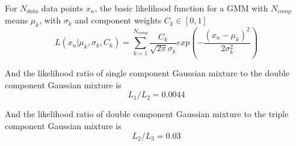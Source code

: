 \documentclass[journal,12pt,twocolumn]{IEEEtran}
\begin{document}
For $N_{data}$ data points $x_n$, the basic likelihood function for a GMM with $N_{comp}$ means $\mu_k$, with $\sigma_k$ and component weights $C_k \in [0,1]$
\begin{equation}
	L(x_n | {\mu_k, \sigma_k, C_k}) = \displaystyle\sum_{k=1}^{N_{comp}} \frac{C_k}{\sqrt{2\pi} \sigma_k} exp\left( -\frac{(x_n - \mu_k)^2}  {2\sigma_k^2}\right)
\end{equation}

And the likelihood ratio of single component Gaussian mixture to the double component Gaussian mixture is
\begin{equation}
	L_1 / L_2 = 0.0044
\end{equation}

And the likelihood ratio of double component Gaussian mixture to the triple component Gaussian mixture is
\begin{equation}
	L_2 / L_3 = 0.03
\end{equation}
\end{document}

